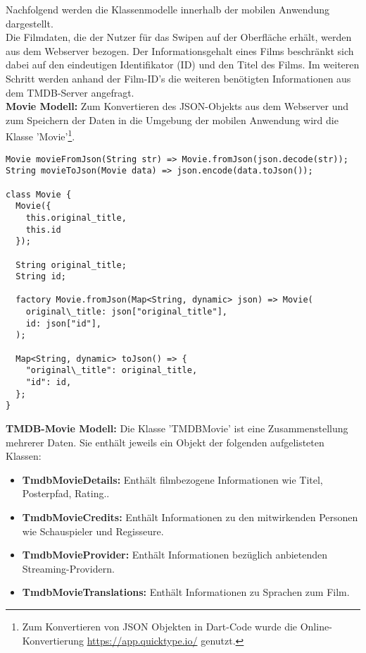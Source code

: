 Nachfolgend werden die Klassenmodelle innerhalb der mobilen Anwendung dargestellt.\\
\noindent
Die Filmdaten, die der Nutzer für das Swipen auf der Oberfläche erhält, werden aus dem Webserver bezogen. Der Informationsgehalt eines Films beschränkt sich dabei auf den eindeutigen Identifikator (ID) und den Titel des Films.
Im weiteren Schritt werden anhand der Film-ID's die weiteren benötigten Informationen aus dem TMDB-Server angefragt. \\

\noindent
\textbf{Movie Modell:}
Zum Konvertieren des JSON-Objekts aus dem Webserver und zum Speichern der Daten in die Umgebung der mobilen Anwendung wird die Klasse 'Movie'\footnote{Zum Konvertieren von JSON Objekten in Dart-Code wurde die Online-Konvertierung \url{https://app.quicktype.io/} genutzt.}. 


\begin{lstlisting}[caption=Movie Modell - JSON Konvertierung, label=lst:moviemodel]
Movie movieFromJson(String str) => Movie.fromJson(json.decode(str));
String movieToJson(Movie data) => json.encode(data.toJson());

class Movie {
  Movie({
    this.original_title,
    this.id
  });

  String original_title;
  String id;

  factory Movie.fromJson(Map<String, dynamic> json) => Movie(
    original\_title: json["original_title"],
    id: json["id"],
  );

  Map<String, dynamic> toJson() => {
    "original\_title": original_title,
    "id": id,
  };
}
\end{lstlisting}

\noindent
\textbf{TMDB-Movie Modell:}
Die Klasse 'TMDBMovie' ist eine Zusammenstellung mehrerer Daten. Sie enthält jeweils ein Objekt der folgenden aufgelisteten Klassen:

\begin{itemize}
\item \textbf{TmdbMovieDetails:} Enthält filmbezogene Informationen wie Titel, Posterpfad, Rating..
\item \textbf{TmdbMovieCredits:} Enthält Informationen zu den mitwirkenden Personen wie Schauspieler und Regisseure.
\item \textbf{TmdbMovieProvider:} Enthält Informationen bezüglich anbietenden Streaming-Providern.
\item \textbf{TmdbMovieTranslations:} Enthält Informationen zu Sprachen zum Film.
\end{itemize}


